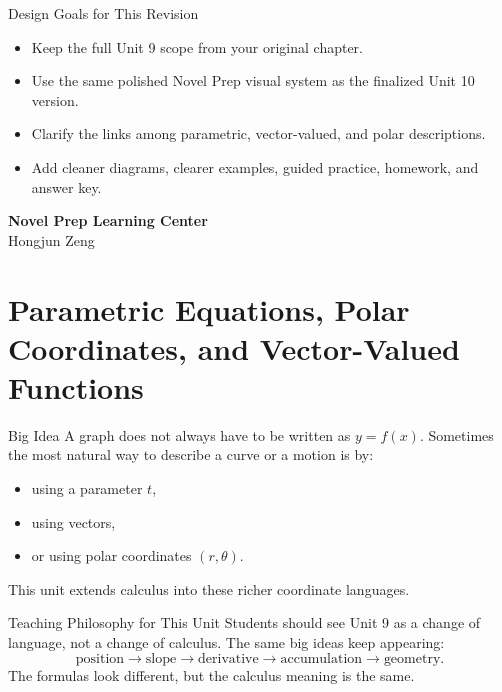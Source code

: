 \documentclass[11pt]{article}
\begin{document}
\begin{titlepage}
\begin{minipage}{0.84\textwidth}
\begin{notebox}{Design Goals for This Revision}
\begin{itemize}
    \item Keep the full Unit 9 scope from your original chapter.
    \item Use the same polished Novel Prep visual system as the finalized Unit 10 version.
    \item Clarify the links among parametric, vector-valued, and polar descriptions.
    \item Add cleaner diagrams, clearer examples, guided practice, homework, and answer key.
\end{itemize}
\end{notebox}
\end{minipage}

\vfill

{\large\textbf{Novel Prep Learning Center}}\\[0.25em]
{\large Hongjun Zeng}

\end{titlepage}

\tableofcontents
\newpage

\setcounter{section}{8}
\section{Parametric Equations, Polar Coordinates, and Vector-Valued Functions}

\begin{theorybox}{Big Idea}
A graph does not always have to be written as \(y=f(x)\).  
Sometimes the most natural way to describe a curve or a motion is by:
\begin{itemize}
    \item using a parameter \(t\),
    \item using vectors,
    \item or using polar coordinates \((r,\theta)\).
\end{itemize}
This unit extends calculus into these richer coordinate languages.
\end{theorybox}

\begin{notebox}{Teaching Philosophy for This Unit}
Students should see Unit 9 as a change of language, not a change of calculus.
The same big ideas keep appearing:
\[
\text{position} \to \text{slope} \to \text{derivative} \to \text{accumulation} \to \text{geometry}.
\]
The formulas look different, but the calculus meaning is the same.
\end{notebox}
\end{document}
